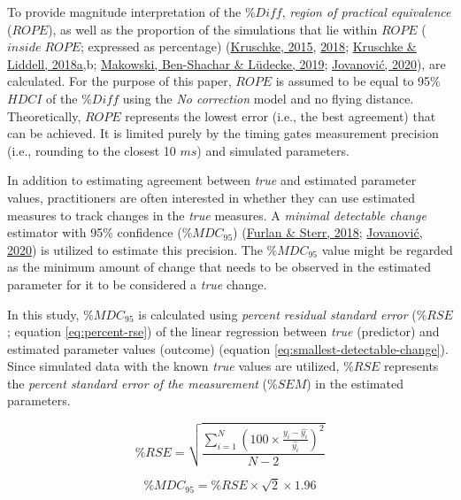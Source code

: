 \documentclass[fleqn,10pt]{wlpeerj} %
\begin{document}
To provide magnitude interpretation of the \(\%Diff\), \emph{region of practical equivalence} (\(ROPE\)), as well as the proportion of the simulations that lie within \(ROPE\) (\(inside \; ROPE\); expressed as percentage) (\protect\hyperlink{ref-kruschkeDoingBayesianData2015}{Kruschke, 2015}, \protect\hyperlink{ref-kruschkeRejectingAcceptingParameter2018}{2018}; \protect\hyperlink{ref-kruschkeBayesianDataAnalysis2018}{Kruschke \& Liddell, 2018a},b; \protect\hyperlink{ref-makowskiBayestestRDescribingEffects2019}{Makowski, Ben-Shachar \& Lüdecke, 2019}; \protect\hyperlink{ref-jovanovicBmbstatsBootstrapMagnitudebased2020}{Jovanović, 2020}), are calculated. For the purpose of this paper, \(ROPE\) is assumed to be equal to 95\% \(HDCI\) of the \(\%Diff\) using the \emph{No correction} model and no flying distance. Theoretically, \(ROPE\) represents the lowest error (i.e., the best agreement) that can be achieved. It is limited purely by the timing gates measurement precision (i.e., rounding to the closest 10 \(ms\)) and simulated parameters.

In addition to estimating agreement between \emph{true} and estimated parameter values, practitioners are often interested in whether they can use estimated measures to track changes in the \emph{true} measures. A \emph{minimal detectable change} estimator with 95\% confidence (\(\%MDC_{95}\)) (\protect\hyperlink{ref-furlanApplicabilityStandardError2018}{Furlan \& Sterr, 2018}; \protect\hyperlink{ref-jovanovicBmbstatsBootstrapMagnitudebased2020}{Jovanović, 2020}) is utilized to estimate this precision. The \(\%MDC_{95}\) value might be regarded as the minimum amount of change that needs to be observed in the estimated parameter for it to be considered a \emph{true} change.

In this study, \(\%MDC_{95}\) is calculated using \emph{percent residual standard error} (\(\%RSE\); equation \eqref{eq:percent-rse}) of the linear regression between \emph{true} (predictor) and estimated parameter values (outcome) (equation \eqref{eq:smallest-detectable-change}). Since simulated data with the known \emph{true} values are utilized, \(\%RSE\) represents the \emph{percent standard error of the measurement} (\(\%SEM\)) in the estimated parameters.

\begin{equation}
  \%RSE = \sqrt{\frac{\sum_{i=1}^N{(100 \times \frac{y_i - \hat{y_i}}{\hat{y_i}})^2}}{N-2}}  \label{eq:percent-rse}
\end{equation}

\begin{equation}
  \%MDC_{95} = \%RSE \times \sqrt{2} \times 1.96  \label{eq:smallest-detectable-change}
\end{equation}
\end{document}
